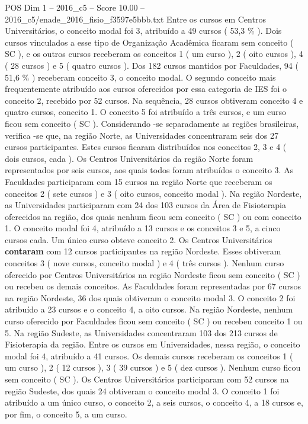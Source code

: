 \begin{textsample}{POS Dim 1 – 2016\_c5 – Score 10.00 – 2016\_c5/enade\_2016\_fisio\_f3597e5bbb.txt}
Entre os cursos em Centros Universitários, o conceito modal foi 3, atribuído a 49 cursos ( 53,3 \% ).
Dois cursos vinculados a esse tipo de Organização Acadêmica ficaram sem conceito ( SC ), e os outros cursos receberam os conceitos 1 ( um curso ), 2 ( oito cursos ), 4 ( 28 cursos ) e 5 ( quatro cursos ).
Dos 182 cursos mantidos por Faculdades, 94 ( 51,6 \% ) receberam conceito 3, o conceito modal.
O segundo conceito mais frequentemente atribuído aos cursos oferecidos por essa categoria de IES foi o conceito 2, recebido por 52 cursos.
Na sequência, 28 cursos obtiveram conceito 4 e quatro cursos, conceito 1.
O conceito 5 foi atribuído a três cursos, e um curso ficou sem conceito ( SC ).
Considerando -se separadamente as regiões brasileiras, verifica -se que, na região Norte, as Universidades concentraram seis dos 27 cursos participantes.
Estes cursos ficaram distribuídos nos conceitos 2, 3 e 4 ( dois cursos, cada ).
Os Centros Universitários da região Norte foram representados por seis cursos, aos quais todos foram atribuídos o conceito 3.
As Faculdades participaram com 15 cursos na região Norte que receberam os conceitos 2 ( sete cursos ) e 3 ( oito cursos, conceito modal ).
Na região Nordeste, as Universidades participaram com 24 dos 103 cursos da Área de Fisioterapia oferecidos na região, dos quais nenhum ficou sem conceito ( SC ) ou com conceito 1.
O conceito modal foi 4, atribuído a 13 cursos e os conceitos 3 e 5, a cinco cursos cada.
Um único curso obteve conceito 2.
Os Centros Universitários \textbf{contaram} com 12 cursos participantes na região Nordeste.
Esses obtiveram conceitos 3 ( nove cursos, conceito modal ) e 4 ( três cursos ).
Nenhum curso oferecido por Centros Universitários na região Nordeste ficou sem conceito ( SC ) ou recebeu os demais conceitos.
As Faculdades foram representadas por 67 cursos na região Nordeste, 36 dos quais obtiveram o conceito modal 3.
O conceito 2 foi atribuído a 23 cursos e o conceito 4, a oito cursos.
Na região Nordeste, nenhum curso oferecido por Faculdades ficou sem conceito ( SC ) ou recebeu conceito 1 ou 5.
Na região Sudeste, as Universidades concentraram 103 dos 213 cursos de Fisioterapia da região.
Entre os cursos em Universidades, nessa região, o conceito modal foi 4, atribuído a 41 cursos.
Os demais cursos receberam os conceitos 1 ( um curso ), 2 ( 12 cursos ), 3 ( 39 cursos ) e 5 ( dez cursos ).
Nenhum curso ficou sem conceito ( SC ).
Os Centros Universitários participaram com 52 cursos na região Sudeste, dos quais 24 obtiveram o conceito modal 3.
O conceito 1 foi atribuído a um único curso, o conceito 2, a seis cursos, o conceito 4, a 18 cursos e, por fim, o conceito 5, a um curso.

\end{textsample}
